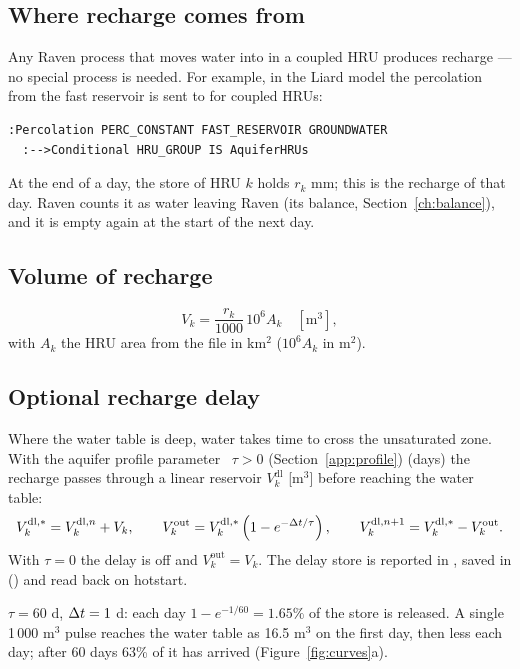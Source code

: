 \subsection{Where recharge comes from}
Any Raven process that moves water into  in a coupled HRU produces recharge --- no special process is
needed. For example, in the Liard model the percolation from the fast reservoir is sent to  for coupled
HRUs:
\par\noindent\begin{minipage}{\linewidth}
\begin{lstlisting}
:Percolation PERC_CONSTANT FAST_RESERVOIR GROUNDWATER
  :-->Conditional HRU_GROUP IS AquiferHRUs
\end{lstlisting}
\end{minipage}\par\smallskip
At the end of a day, the  store of HRU $k$ holds $r_k$ mm; this is the recharge of that day. Raven
counts it as water leaving Raven (its balance, Section~\ref{ch:balance}), and it is empty again at the start of the
next day.

\subsection{Volume of recharge}
\begin{equation}
V_k=\frac{r_k}{1000}\,10^{6}A_k \quad[\mathrm{m}^3],
\end{equation}
with $A_k$ the HRU area from the  file in km$^2$ ($10^6A_k$ in m$^2$).

\subsection{Optional recharge delay}
Where the water table is deep, water takes time to cross the unsaturated zone. With the aquifer profile parameter ~$\tau>0$ (Section~\ref{app:profile})
(days) the recharge passes through a linear reservoir $V^{\mathrm{dl}}_k$ [m$^3$] before reaching the water table:
\begin{equation}
V^{\mathrm{dl},*}_k=V^{\mathrm{dl},n}_k+V_k,\qquad V_k^{\mathrm{out}}=V^{\mathrm{dl},*}_k\left(1-e^{-\Delta t/\tau}\right),\qquad V^{\mathrm{dl},n+1}_k=V^{\mathrm{dl},*}_k-V_k^{\mathrm{out}} .
\end{equation}
With $\tau=0$ the delay is off and $V_k^{\mathrm{out}}=V_k$. The delay store is reported in , saved in
 () and read back on hotstart.
\begin{example}
$\tau=60$ d, $\Delta t=1$ d: each day $1-e^{-1/60}=1.65\%$ of the store is released. A single 1\,000 m$^3$ pulse reaches the
water table as 16.5 m$^3$ on the first day, then less each day; after 60 days 63\% of it has arrived
(Figure~\ref{fig:curves}a).
\end{example}

